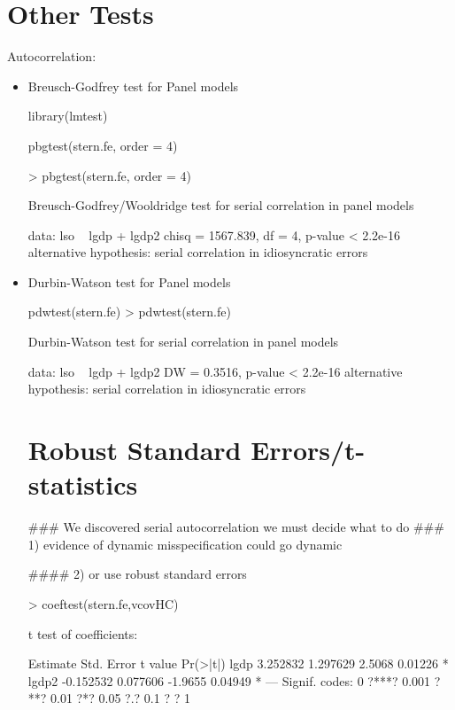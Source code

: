 \documentclass[landscape,letterpaper,9pt]{article}
\newcommand\cbox[1]{\colorbox{darkyellow}{#1}}
\begin{document}
\newpage
\section{Other Tests}
Autocorrelation:
\begin{itemize}
\item  \cbox{Breusch-Godfrey test} for Panel models
\vspace{.1in}
\begin{CVerbatim}
library(lmtest)


pbgtest(stern.fe, order = 4)

> pbgtest(stern.fe, order = 4)

        Breusch-Godfrey/Wooldridge test for serial correlation in panel models

data:  lso ~ lgdp + lgdp2
chisq = 1567.839, df = 4, p-value < 2.2e-16
alternative hypothesis: serial correlation in idiosyncratic errors
\end{CVerbatim}
\vspace{.1in}

\newpage
\item  \cbox{Durbin-Watson test} for Panel models
\vspace{.1in}
\begin{CVerbatim}
pdwtest(stern.fe)
> pdwtest(stern.fe)

        Durbin-Watson test for serial correlation in panel models

data:  lso ~ lgdp + lgdp2
DW = 0.3516, p-value < 2.2e-16
alternative hypothesis: serial correlation in idiosyncratic errors
\end{CVerbatim}
\vspace{.1in}
\newpage
\section{Robust Standard Errors/t-statistics}
\begin{CVerbatim}
### We discovered serial autocorrelation we must decide what to do
### 1) evidence of dynamic misspecification could go dynamic

#### 2) or use robust standard errors

 > coeftest(stern.fe,vcovHC)

 t test of coefficients:

        Estimate Std. Error t value Pr(>|t|)
 lgdp   3.252832   1.297629  2.5068  0.01226 *
 lgdp2 -0.152532   0.077606 -1.9655  0.04949 *
 ---
 Signif. codes:  0 ?***? 0.001 ?**? 0.01 ?*? 0.05 ?.? 0.1 ? ? 1 
\end{CVerbatim}


\end{itemize}
\end{document}
